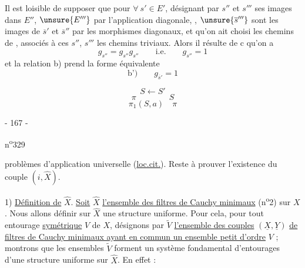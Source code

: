  Il est loisible de supposer que pour $\forall\ s'\in E'$,
désignant par $s''$ et $s'''$ ses images dans $E''$, $\unsure{E'''}$
par l'application diagonale,
,
$\unsure{\overline{s}'''}$ sont les images de $\overline{s}'$ et
$\overline{s}''$ par les morphismes diagonaux, et qu'on ait choisi
les  chemins de , associés à ces $s''$, $s'''$
 les chemins triviaux.
Alors il résulte de c qu'on a
\[
g_{s''}=g_{s''}g_{s''}\qquad\text{i.e.}\qquad g_{s''}=1
\]
et la relation b) prend la forme équivalente
\[
\text{b')}\qquad g_{\overline{s}'}=1
\]


\[
S\longleftarrow S'
\]
\[
\pi\qquad\qquad S
\]
\[
\pi_1(S,a)\quad\pi
\]
\begin{center}- 167 -\end{center}
\hfill n\textsuperscript{o}329

problèmes d'application universelle (\uline{loc.cit.}). Reste à prouver l'existence
du couple $(i,\widehat{X})$.

1) \uline{Définition de} $\widehat{X}$. \uline{Soit} $\widehat{X}$
\uline{l'ensemble des filtres de Cauchy minimaux} (n\textsuperscript{o}2)
sur $X$. Nous allons définir sur $\widehat{X}$ une structure uniforme.
Pour cela, pour tout entourage \uline{symétrique} $V$ de $X$, désignons par
$\widetilde{V}$ \uline{l'ensemble des couples}
$(\underline{X},\underline{Y})$ \uline{de filtres de Cauchy minimaux ayant en commun
un ensemble petit d'ordre} $V$ ; montrons que les ensembles $\widetilde{V}$
forment un système fondamental d'entourages d'une structure uniforme sur
$\widehat{X}$. En effet :

